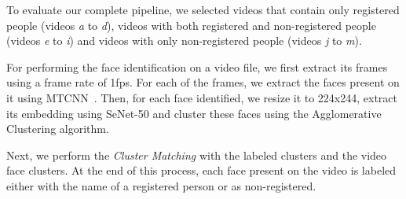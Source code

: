 To evaluate our complete pipeline, we selected videos that contain only registered people (videos \emph{a} to \emph{d}), videos with both registered and non-registered people (videos \emph{e} to \emph{i}) and videos with only non-registered people (videos \emph{j} to \emph{m}).

For performing the face identification on a video file, we first extract its frames using a frame rate of 1fps.
For each of the frames, we extract the faces present on it using MTCNN~\cite{mtcnn}. 
Then, for each face identified, we resize it to 224x244, extract its embedding using SeNet-50 and cluster these faces using the Agglomerative Clustering algorithm.

Next, we perform the \emph{Cluster Matching} with the labeled clusters and the video face clusters.
At the end of this process, each face present on the video is labeled either with the name of a registered person or as non-registered.

